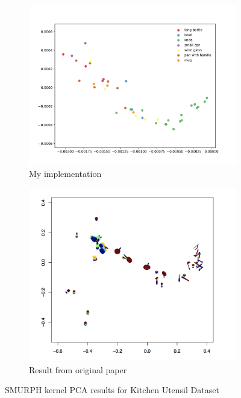 \documentclass[10pt]{article}
\begin{document}
\begin{figure}[H]
    \centering
    \begin{subfigure}[H]{0.4\textwidth}
        \includegraphics[width=\linewidth]{DB_smurf_with_legend}
        \caption{My implementation}
    \end{subfigure}
    \begin{subfigure}[h]{0.37\textwidth}
        \includegraphics[width=\linewidth]{original_smurph}
        \caption{Result from original paper}
    \end{subfigure}%
    \caption{SMURPH kernel PCA results for Kitchen Utensil Dataset}
    \label{fig:smurph_compare}
\end{figure}
\end{document}
